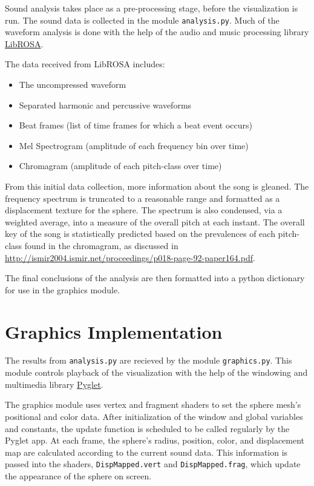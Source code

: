 \documentclass{article}
\newcommand{\code}{\texttt}
\begin{document}
Sound analysis takes place as a pre-processing stage, before the visualization is run. The sound data is collected in the module \code{analysis.py}. Much of the waveform analysis is done with the help of the audio and music processing library \href{https://github.com/bmcfee/librosa/}{LibROSA}.

The data received from LibROSA includes:

\begin{itemize}
    \item The uncompressed waveform
    \item Separated harmonic and percussive waveforms
    \item Beat frames (list of time frames for which a beat event occurs)
    \item Mel Spectrogram (amplitude of each frequency bin over time)
    \item Chromagram (amplitude of each pitch-class over time)
\end{itemize}

From this initial data collection, more information about the song is gleaned. The frequency spectrum is truncated to a reasonable range and formatted as a displacement texture for the sphere. The spectrum is also condensed, via a weighted average, into a measure of the overall pitch at each instant. The overall key of the song is statistically predicted based on the prevalences of each pitch-class found in the chromagram, as discussed in \url{http://ismir2004.ismir.net/proceedings/p018-page-92-paper164.pdf}. 

The final conclusions of the analysis are then formatted into a python dictionary for use in the graphics module.

\section{Graphics Implementation}

The results from \code{analysis.py} are recieved by the module \code{graphics.py}. This module controls playback of the visualization with the help of the windowing and multimedia library \href{http://www.pyglet.org/}{Pyglet}.

The graphics module uses vertex and fragment shaders to set the sphere mesh's positional and color data. After initialization of the window and global variables and constants, the update function is scheduled to be called regularly by the Pyglet app. At each frame, the sphere's radius, position, color, and displacement map are calculated according to the current sound data. This information is passed into the shaders, \code{DispMapped.vert} and \code{DispMapped.frag}, which update the appearance of the sphere on screen.
\end{document}
